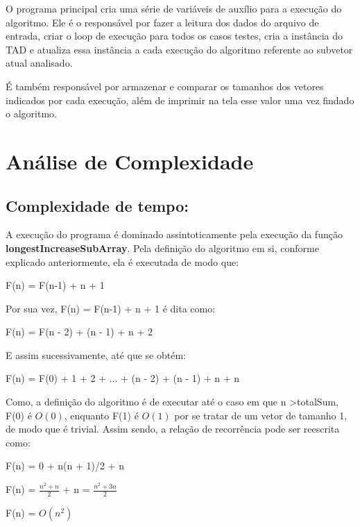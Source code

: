 \documentclass[12pt]{article}
\begin{document}
    \par O programa principal cria uma série de variáveis de auxílio para a execução do algoritmo. Ele é o responsável por fazer a leitura dos dados do arquivo de entrada, criar o loop de execução para todos os casos testes, cria a instância do TAD e atualiza essa instância a cada execução do algoritmo referente ao subvetor atual analisado.
    \par É também responsável por armazenar e comparar os tamanhos dos vetores indicados por cada execução, além de imprimir na tela esse valor uma vez findado o algoritmo.



\section{Análise de Complexidade}
\subsection {Complexidade de tempo:}
    \par A execução do programa é dominado assintoticamente pela execução da função \textbf{longestIncreaseSubArray}. Pela definição do algoritmo em si, conforme explicado anteriormente, ela é executada de modo que:
    \par {\begin{center} F(n) = F(n-1) + n + 1\end{center}}
    \par Por sua vez, F(n) = F(n-1) + n + 1 é dita como:
    \par {\begin{center} F(n) = F(n - 2) + (n - 1) + n + 2 \end{center}}
    \par E assim sucessivamente, até que se obtém:
    {\begin{center}
        F(n) = F(0) + 1 + 2 + ... + (n - 2) + (n - 1) + n + n
    \end{center}}
    \par Como, a definição do algoritmo é de executar até o caso em que n \textgreater\space totalSum, F(0) é $O(0)$, enquanto F(1) é $O(1)$ por se tratar de um vetor de tamanho 1, de modo que é trivial. Assim sendo, a relação de recorrência pode ser reescrita como:
    {\begin{center}
    F(n) = 0 + n(n + 1)/2 + n
\par F(n) = $\frac{n^2 + n}{2}$ + n = $\frac{n^2 + 3n}{2}$
\par F(n) = $O(n^2)$
    \end{center}}
    
\end{document}
